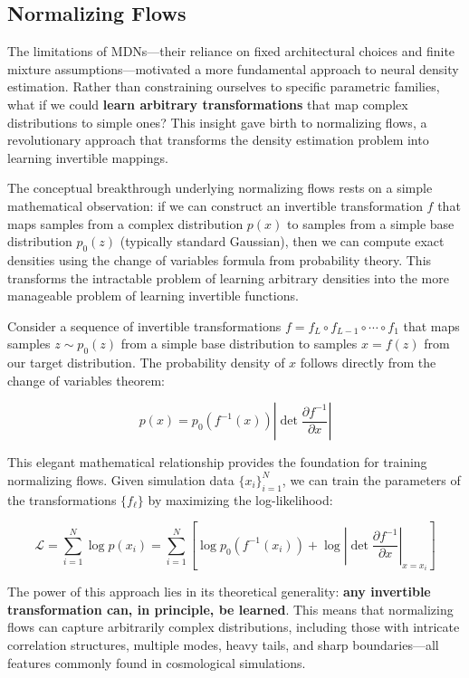 \documentclass{SciPost}
\begin{document}
\subsection{Normalizing Flows}

The limitations of MDNs—their reliance on fixed architectural choices and finite mixture assumptions—motivated a more fundamental approach to neural density estimation. Rather than constraining ourselves to specific parametric families, what if we could \textbf{learn arbitrary transformations} that map complex distributions to simple ones? This insight gave birth to normalizing flows, a revolutionary approach that transforms the density estimation problem into learning invertible mappings.

The conceptual breakthrough underlying normalizing flows rests on a simple mathematical observation: if we can construct an invertible transformation $f$ that maps samples from a complex distribution $p(x)$ to samples from a simple base distribution $p_0(z)$ (typically standard Gaussian), then we can compute exact densities using the change of variables formula from probability theory. This transforms the intractable problem of learning arbitrary densities into the more manageable problem of learning invertible functions.

Consider a sequence of invertible transformations $f = f_L \circ f_{L-1} \circ \cdots \circ f_1$ that maps samples $z \sim p_0(z)$ from a simple base distribution to samples $x = f(z)$ from our target distribution. The probability density of $x$ follows directly from the change of variables theorem:

\begin{equation}
    p(x) = p_0(f^{-1}(x)) \left| \det \frac{\partial f^{-1}}{\partial x} \right|
\end{equation}

This elegant mathematical relationship provides the foundation for training normalizing flows. Given simulation data $\{x_i\}_{i=1}^N$, we can train the parameters of the transformations $\{f_\ell\}$ by maximizing the log-likelihood:

\begin{equation}
    \mathcal{L} = \sum_{i=1}^N \log p(x_i) = \sum_{i=1}^N \left[ \log p_0(f^{-1}(x_i)) + \log \left| \det \frac{\partial f^{-1}}{\partial x} \right|_{x=x_i} \right]
\end{equation}

The power of this approach lies in its theoretical generality: \textbf{any invertible transformation can, in principle, be learned}. This means that normalizing flows can capture arbitrarily complex distributions, including those with intricate correlation structures, multiple modes, heavy tails, and sharp boundaries—all features commonly found in cosmological simulations.
\end{document}
